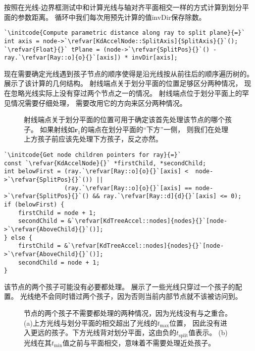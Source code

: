 按照在光线-边界框测试中和计算光线与轴对齐平面相交一样的方式计算到划分平面的参数距离。
循环中我们每次用预先计算的值{\ttfamily invDir}保存除数。
\begin{lstlisting}
`\initcode{Compute parametric distance along ray to split plane}{=}`
int axis = node->`\refvar[KdAccelNode::SplitAxis]{SplitAxis}{}`();
`\refvar{Float}{}` tPlane = (node->`\refvar{SplitPos}{}`() - ray.`\refvar[Ray::o]{o}{}`[axis]) * invDir[axis];
\end{lstlisting}

现在需要确定光线遇到孩子节点的顺序使得是沿光线按从前往后的顺序遍历树的。
展示了该计算的几何结构。
射线端点关于划分平面的位置足够区分两种情况，
现在忽略光线实际上没有穿过两个节点之一的情况。
射线端点位于划分平面上的罕见情况需要仔细处理，
需要改用它的方向来区分两种情况。
\begin{figure}[htbp]
    \centering
    \caption{射线端点关于划分平面的位置可用于确定该首先处理该节点的哪个孩子。
    如果射线如$\bm r_1$的端点在划分平面的“下方”一侧，
    则我们在处理上方孩子前应该先处理下方孩子，反之亦然。}
    \label{fig:4.18}
\end{figure}
\begin{lstlisting}
`\initcode{Get node children pointers for ray}{=}`
const `\refvar{KdAccelNode}{}` *firstChild, *secondChild;
int belowFirst = (ray.`\refvar[Ray::o]{o}{}`[axis] <  node->`\refvar{SplitPos}{}`()) ||
                 (ray.`\refvar[Ray::o]{o}{}`[axis] == node->`\refvar{SplitPos}{}`() && ray.`\refvar[Ray::d]{d}{}`[axis] <= 0);
if (belowFirst) {
    firstChild = node + 1;
    secondChild = &`\refvar[KdTreeAccel::nodes]{nodes}{}`[node->`\refvar{AboveChild}{}`()];
} else {
    firstChild = &`\refvar[KdTreeAccel::nodes]{nodes}{}`[node->`\refvar{AboveChild}{}`()];
    secondChild = node + 1;
}
\end{lstlisting}

该节点的两个孩子可能没有必要都处理。
展示了一些光线只穿过一个孩子的配置。
光线绝不会同时错过两个孩子，因为否则当前内部节点就不该被访问到。
\begin{figure}[htbp]
    \centering
    \caption{节点的两个孩子不需要都处理的两种情况，因为光线没有与之重合。
    (a)上方光线与划分平面的相交超出了光线的$t_{\max}$位置，
    因此没有进入更远的孩子。下方光线背对划分平面，这由负的$t_{\text{split}}$值表示。
    (b)光线在其$t_{\min}$值之前与平面相交，意味着不需要处理近处孩子。}
    \label{fig:4.19}
\end{figure}

